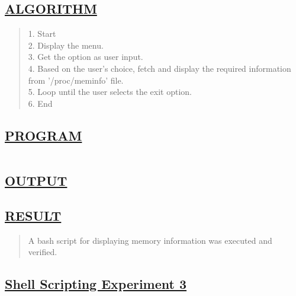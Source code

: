 \documentclass[a4paper, 12pt]{article}
\begin{document}
\subsection*{\underline{ALGORITHM}}
\begin{quote}
1. Start\\
2. Display the menu.\\
3. Get the option as user input.\\
4. Based on the user's choice, fetch and display the required information from '/proc/meminfo' file.\\
5. Loop until the user selects the exit option.\\
6. End\\
\end{quote}

\subsection*{\underline{PROGRAM}}
\begin{quote}
\inputminted[fontsize=\small,breaklines,breakanywhere]{sh}{shell1.sh}%
\end{quote}


\subsection*{\underline{OUTPUT}}

\begin{figure}[H] 
    \centering
\end{figure}


\subsection*{\underline{RESULT}}
\begin{quote}
A bash script for displaying memory information was executed and verified.
\end{quote}

\newpage
\begin{center}
\section*{\LARGE \textbf{\underline{Shell Scripting Experiment 3}}} %
\end{center}
\end{document}
